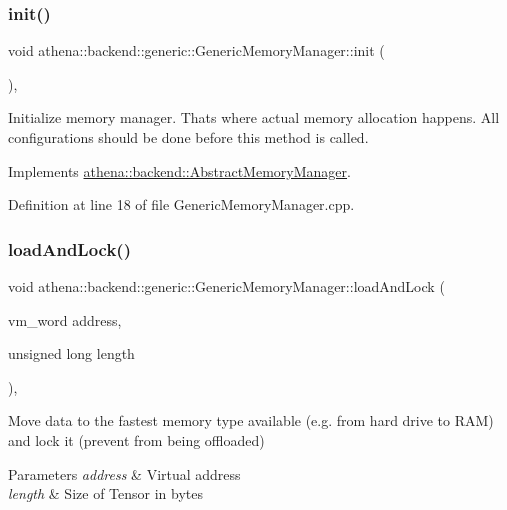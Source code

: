 \subsubsection{\texorpdfstring{init()}{init()}}
{\footnotesize\ttfamily void athena\+::backend\+::generic\+::\+Generic\+Memory\+Manager\+::init (\begin{DoxyParamCaption}{ }\end{DoxyParamCaption})\hspace{0.3cm}{\ttfamily [override]}, {\ttfamily [virtual]}}

Initialize memory manager. That\textquotesingle{}s where actual memory allocation happens. All configurations should be done before this method is called. 

Implements \mbox{\hyperlink{classathena_1_1backend_1_1_abstract_memory_manager}{athena\+::backend\+::\+Abstract\+Memory\+Manager}}.



Definition at line 18 of file Generic\+Memory\+Manager.\+cpp.

\mbox{\label{classathena_1_1backend_1_1generic_1_1_generic_memory_manager_aa7fce5a6cbd9c4f5ad1868735e4546a8}} 
\subsubsection{\texorpdfstring{load\+And\+Lock()}{loadAndLock()}\hspace{0.1cm}{\footnotesize\ttfamily [1/4]}}
{\footnotesize\ttfamily void athena\+::backend\+::generic\+::\+Generic\+Memory\+Manager\+::load\+And\+Lock (\begin{DoxyParamCaption}\item[{vm\+\_\+word}]{address,  }\item[{unsigned long}]{length }\end{DoxyParamCaption})\hspace{0.3cm}{\ttfamily [override]}, {\ttfamily [virtual]}}

Move data to the fastest memory type available (e.\+g. from hard drive to R\+AM) and lock it (prevent from being offloaded) 
\begin{DoxyParams}{Parameters}
{\em address} & Virtual address \\
\hline
{\em length} & Size of Tensor in bytes \\
\hline
\end{DoxyParams}


